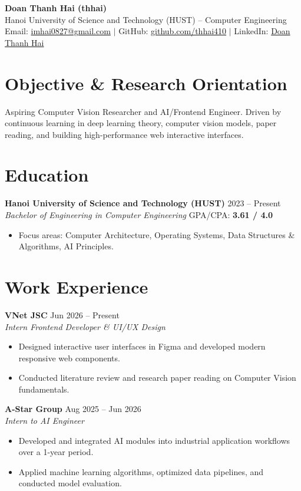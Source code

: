 \documentclass[11pt,a4paper]{article}
\begin{document}
\begin{center}
    {\Huge \textbf{Doan Thanh Hai (thhai)}}\\
    \vspace{2mm}
    Hanoi University of Science and Technology (HUST) -- Computer Engineering\\
    Email: \href{mailto:imhai0827@gmail.com}{imhai0827@gmail.com} $|$ 
    GitHub: \href{https://github.com/thhai410}{github.com/thhai410} $|$ 
    LinkedIn: \href{https://www.linkedin.com/in/thanh-h%E1%BA%A3i-91054a42a/}{Doan Thanh Hai}
\end{center}

\section*{Objective \& Research Orientation}
Aspiring Computer Vision Researcher and AI/Frontend Engineer. Driven by continuous learning in deep learning theory, computer vision models, paper reading, and building high-performance web interactive interfaces.

\section*{Education}
\textbf{Hanoi University of Science and Technology (HUST)} \hfill 2023 -- Present\\
\textit{Bachelor of Engineering in Computer Engineering} \hfill GPA/CPA: \textbf{3.61 / 4.0}
\begin{itemize}[noitemsep]
    \item Focus areas: Computer Architecture, Operating Systems, Data Structures \& Algorithms, AI Principles.
\end{itemize}

\section*{Work Experience}
\textbf{VNet JSC} \hfill Jun 2026 -- Present\\
\textit{Intern Frontend Developer \& UI/UX Design}
\begin{itemize}[noitemsep]
    \item Designed interactive user interfaces in Figma and developed modern responsive web components.
    \item Conducted literature review and research paper reading on Computer Vision fundamentals.
\end{itemize}

\textbf{A-Star Group} \hfill Aug 2025 -- Jun 2026\\
\textit{Intern to AI Engineer}
\begin{itemize}[noitemsep]
    \item Developed and integrated AI modules into industrial application workflows over a 1-year period.
    \item Applied machine learning algorithms, optimized data pipelines, and conducted model evaluation.
\end{itemize}
\end{document}
